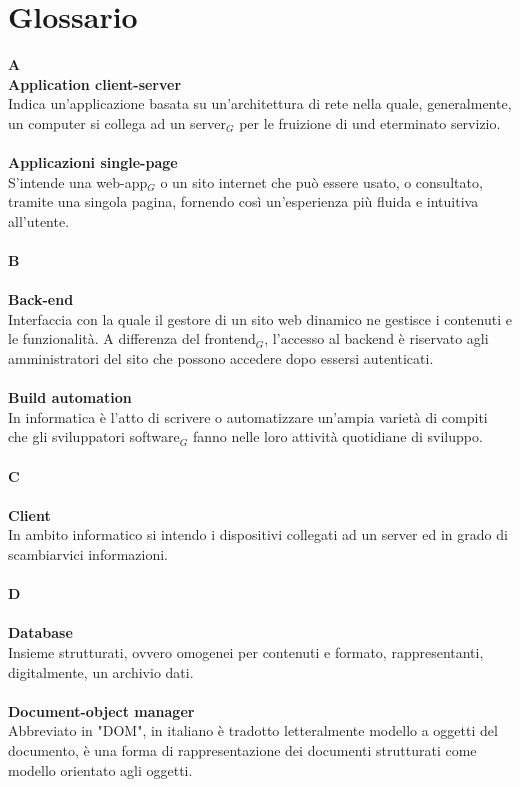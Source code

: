\chapter{Glossario} \label{Glossario}
\textbf{A} \\
\textbf{Application client-server} \\
Indica un'applicazione basata su un'architettura di rete nella quale, generalmente, un computer si collega ad un server$_G$ per le fruizione di und eterminato servizio.\\
\\
\textbf{Applicazioni single-page} \\
S'intende una web-app$_G$ o un sito internet che può essere usato, o consultato, tramite una singola pagina, fornendo così un'esperienza più fluida e intuitiva all'utente.\\
\\
\textbf{B} \\
\\
\textbf{Back-end} \\
Interfaccia con la quale il gestore di un sito web dinamico ne gestisce i contenuti e le funzionalità. A differenza del frontend$_G$, l'accesso al backend è riservato agli amministratori del sito che possono accedere dopo essersi autenticati.\\
\\
\textbf{Build automation} \\
In informatica è l'atto di scrivere o automatizzare un'ampia varietà di compiti che gli sviluppatori software$_G$ fanno nelle loro attività quotidiane di sviluppo.\\
\\
\textbf{C} \\
\\
\textbf{Client} \\
In ambito informatico si intendo i dispositivi collegati ad un server ed in grado di scambiarvici informazioni.\\
\\
\textbf{D} \\
\\
\textbf{Database} \\
Insieme strutturati, ovvero omogenei per contenuti e formato, rappresentanti, digitalmente, un archivio dati.\\
\\
\textbf{Document-object manager} \\
Abbreviato in "DOM", in italiano è tradotto letteralmente modello a oggetti del documento, è una forma di rappresentazione dei documenti strutturati come modello orientato agli oggetti.\\
